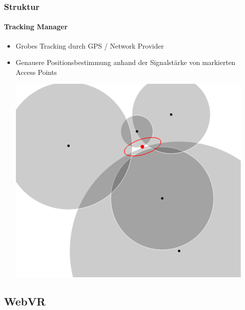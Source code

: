 \documentclass{beamer}
\begin{document}
\begin{frame}
\frametitle{Struktur}
\framesubtitle{Tracking Manager}
\begin{itemize}
  	\item	Grobes Tracking durch GPS / Network Provider \pause
 	\item 	Genauere Positionsbestimmung anhand der Signalstärke von markierten Access Points
			\begin{center}
			\includegraphics[scale=0.5]{trilateration.png}
			\end{center}
\end{itemize}
\end{frame}

\subsection{WebVR}
\end{document}
